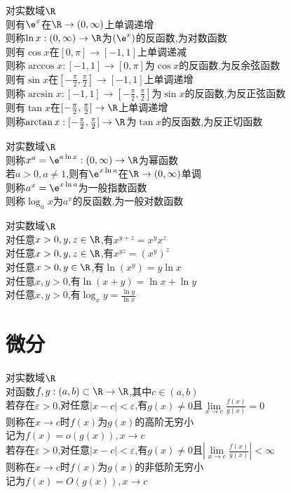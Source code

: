 \begin{dingyi}
对实数域$\R$\\
则有$\e^x$在$\R\to(0,\infty)$上单调递增\\
则称$\ln x:(0,\infty)\to\R$为$(\e^x)$的反函数,为对数函数\\
则有$\cos x$在$[0,\pi]\to[-1,1]$上单调递减\\
则称$\arccos x:[-1,1]\to[0,\pi]$为$\cos x$的反函数,为反余弦函数\\
则有$\sin x$在$[-\frac{\pi}{2},\frac{\pi}{2}]\to[-1,1]$上单调递增\\
则称$\arcsin x:[-1,1]\to[-\frac{\pi}{2},\frac{\pi}{2}]$为$\sin x$的反函数,为反正弦函数\\
则有$\tan x$在$[-\frac{\pi}{2},\frac{\pi}{2}]\to\R$上单调递增\\
则称$\arctan x:[-\frac{\pi}{2},\frac{\pi}{2}]\to\R$为$\tan x$的反函数,为反正切函数
\end{dingyi}

\begin{dingyi}
对实数域$\R$\\
则称$x^a=\e^{a\ln x}:(0,\infty)\to\R$为幂函数\\
若$a>0,a\neq 1$,则有$\e^{x\ln a}$在$\R\to (0,\infty)$单调\\
则称$a^x=\e^{x\ln a}$为一般指数函数\\
则称$\log_{a}x$为$a^x$的反函数,为一般对数函数
\end{dingyi}

\begin{dingli}
对实数域$\R$\\
对任意$x>0,y,z\in \R$,有$x^{y+z}=x^yx^z$\\
对任意$x>0,y,z\in \R$,有$x^{yz}=(x^y)^z$\\
对任意$x>0,y\in \R$,有$\ln(x^{y})=y\ln x$\\
对任意$x,y>0$,有$\ln(x+y)=\ln x+\ln y$\\
对任意$x,y>0$,有$\log_{x}y=\frac{\ln y}{\ln x}$
\end{dingli}

\chapter{微分}

\begin{dingyi}
对实数域$\R$\\
对函数$f,g:(a,b)\subset \R \to \R$,其中$c\in (a,b)$\\
若存在$\varepsilon>0$,对任意$|x-c|<\varepsilon$,有$g(x)\neq 0$且$\lim\limits_{x\to c}\frac{f(x)}{g(x)}=0$\\
则称在$x\to c$时$f(x)$为$g(x)$的高阶无穷小\\
记为$f(x)=o(g(x)),x\to c$\\
若存在$\varepsilon>0$,对任意$|x-c|<\varepsilon$,有$g(x)\neq 0$且$|\lim\limits_{x\to c}\frac{f(x)}{g(x)}|<\infty$\\
则称在$x\to c$时$f(x)$为$g(x)$的非低阶无穷小\\
记为$f(x)=O(g(x)),x\to c$
\end{dingyi}

